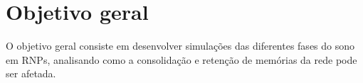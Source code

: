\section{Objetivo geral}

O objetivo geral consiste em desenvolver simulações das diferentes fases do sono em RNPs, analisando como a consolidação e
retenção de memórias da rede pode ser afetada.
